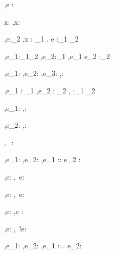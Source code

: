 



  {\Gamma,\Sigma \infers e : \tau}


  {x:\tau\in\Gamma}
  {\Gamma,\Sigma\infers x:\tau}


  {\Gamma[x:\tau_1] ,\Sigma \infers e:\tau_2}
  {\Gamma,\Sigma \infers \lambda x : \tau_1 . e :\tau_1 \to \tau_2}

  {\Gamma,\Sigma \infers e_1:\tau_1\to\tau_2 \Quad
   \Gamma,\Sigma \infers e_2:\tau_1}
  {\Gamma,\Sigma \infers e_1 e_2 :\tau_2}


  {\Gamma,\Sigma \infers e_1:\Bool \Quad
   \Gamma,\Sigma \infers e_2:\tau \Quad
   \Gamma,\Sigma \infers e_3:\tau}
  {\Gamma,\Sigma \infers {}:\tau}


    {\Gamma,\Sigma \infers e_1 : \tau_1  \Quad
     \Gamma,\Sigma \infers e_2 : \tau_2}
    {\Gamma,\Sigma \infers {} :\tau_1 \times \tau_2}

  {\Gamma,\Sigma\infers e_1:\tau}
  {\Gamma,\Sigma\infers \Fst {}:\tau}

    {\Gamma,\Sigma\infers e_2:\tau}
    {\Gamma,\Sigma\infers \Snd {}:\tau}

  { }
  {\Gamma,\Sigma\infers [\ ]_\beta : \beta}

  {\Gamma,\Sigma\infers e_1:\beta \Quad
   \Gamma,\Sigma\infers e_2:\beta}
  {\Gamma,\Sigma\infers e_1 :: e_2 :  \beta}

  {\Gamma,\Sigma\infers e:\beta}
  {\Gamma,\Sigma\infers {}\ e:\beta}

    {\Gamma,\Sigma\infers e:\beta}
    {\Gamma,\Sigma\infers {}\ e:\beta}



  {\Gamma,\Sigma \infers e:\beta}
  {\Gamma,\Sigma \infers \Ref e :\Reference \beta}

  {\Gamma,\Sigma \infers e:\Reference \beta}
  {\Gamma,\Sigma\infers\ !e:\beta}

  {\Gamma,\Sigma\infers e_1:\Reference \beta \Quad
   \Gamma,\Sigma\infers e_2:\beta}
  {\Gamma,\Sigma\infers e_1 := e_2:\Unit}

